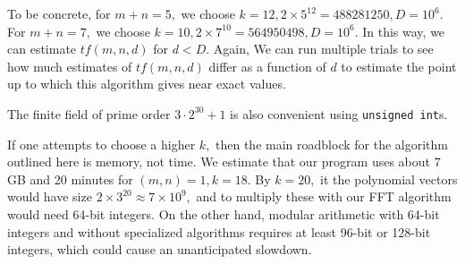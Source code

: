 \documentclass[11pt]{amsart} %
\begin{document}
To be concrete, for $m+n = 5,$ we choose $k = 12, 2\times 5^{12} = 488281250, D = 10^6.$ For $m+n=7,$ we choose $k = 10, 2\times 7^{10} = 564950498, D = 10^6.$ In this way, we can estimate $tf(m, n, d)$ for $d < D.$ Again, We can run multiple trials to see how much estimates of $tf(m,n,d)$ differ as a function of $d$ to estimate the point up to which this algorithm gives near exact values.

\begin{remark} The finite field of prime order $3 \cdot 2^{30} + 1$ is also convenient using \texttt{unsigned int}s. \end{remark}

\begin{remark} If one attempts to choose a higher $k,$ then the main roadblock for the algorithm outlined here is memory, not time. We estimate that our program uses about 7 GB and 20 minutes for $(m,n) = 1, k = 18.$  By $k = 20,$ it the polynomial vectors would have size $2 \times 3^{20} \approx 7 \times 10^9,$ and to multiply these  with our FFT algorithm would need 64-bit integers. On the other hand, modular arithmetic with 64-bit integers and without specialized algorithms requires at least 96-bit or 128-bit integers, which could cause an unanticipated slowdown.  \end{remark}
\end{document}
